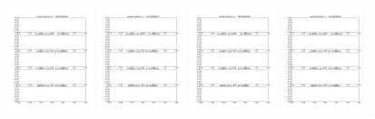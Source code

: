 \documentclass[11pt]{article}
\begin{document}
\vskip 10pt 
\includegraphics[width=0.19\textwidth]{frame0097fig1.png}
\vskip 10pt 
\includegraphics[width=0.19\textwidth]{frame0098fig1.png}
\vskip 10pt 
\includegraphics[width=0.19\textwidth]{frame0099fig1.png}
\vskip 10pt 
\includegraphics[width=0.19\textwidth]{frame0100fig1.png}
\end{document}
